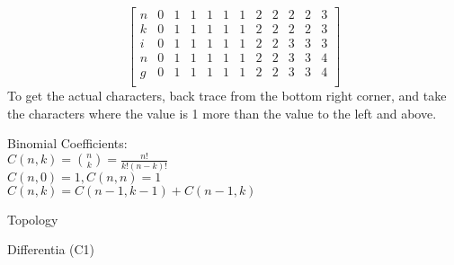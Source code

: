 \begin{itemize}
\begin{theorem}
$$\begin{bmatrix}
n & 0 & 1 & 1 & 1 & 1 & 1 & 2 & 2 & 2 & 2 & 3\\
k & 0 & 1 & 1 & 1 & 1 & 1 & 2 & 2 & 2 & 2 & 3\\
i & 0 & 1 & 1 & 1 & 1 & 1 & 2 & 2 & 3 & 3 & 3\\
n & 0 & 1 & 1 & 1 & 1 & 1 & 2 & 2 & 3 & 3 & 4\\
g & 0 & 1 & 1 & 1 & 1 & 1 & 2 & 2 & 3 & 3 & 4\\
\end{bmatrix} 
			$$
			To get the actual characters, back trace from the bottom right corner, and take the characters where the value is 1 more than the value to the left and above.\\
		\end{theorem}
		\begin{example}
			Binomial Coefficients:\\
			$C(n,k) = \binom{n}{k} = \frac{n!}{k!\left( n-k \right) !}$\\
			$C(n,0) = 1, C(n,n) = 1$\\
			$ C(n,k) = C(n-1, k-1) + C(n-1, k)$\\
		\end{example}
		\begin{example}
			Topology
		\end{example}
		\begin{example}
			Differentia (C1)
		\end{example}
\end{itemize}
